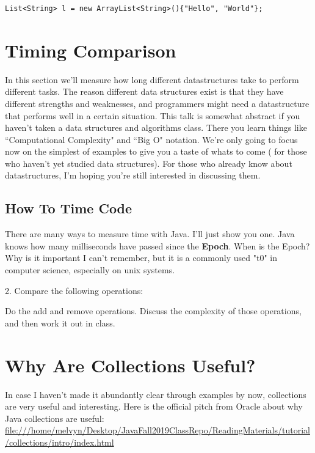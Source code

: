\documentclass[12pt]{article}
\begin{document}
\begin{lstlisting}
List<String> l = new ArrayList<String>(){"Hello", "World"};
\end{lstlisting}

\section{Timing Comparison}
In this section we'll measure how long different datastructures take to perform different tasks. The reason different data structures exist is that they have different strengths and weaknesses, and programmers might need a datastructure that performs well in a certain situation. This talk is somewhat abstract if you haven't taken  a data structures and algorithms class. There you learn things like ``Computational Complexity" and ``Big O" notation. We're only going to focus now on the simplest of examples to give you a taste of whats to come ( for those who haven't yet studied data structures). For those who already know about datastructures, I'm hoping you're still interested in discussing them.

\subsection{How To Time Code}
There are many ways to measure time with Java. I'll just show you one. Java knows how many milliseconds have passed since the \textbf{Epoch}. When is the Epoch? Why is it important I can't remember, but it is a commonly used "t0" in computer science, especially on unix systems. 



2. Compare the following operations:

Do the add and remove operations. Discuss the complexity of those operations, and then work it out in class.



\section{Why Are Collections Useful?}
In case I haven't made it abundantly clear through examples by now, collections are very useful and interesting. Here is the official pitch from Oracle about why Java collections are useful:
\url{file:///home/melvyn/Desktop/JavaFall2019ClassRepo/ReadingMaterials/tutorial/collections/intro/index.html}
\end{document}
